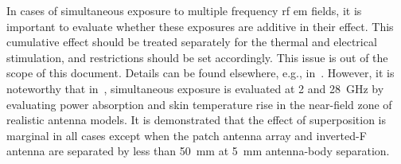 In cases of simultaneous exposure to multiple frequency \gls{rf} \gls{em} fields, it is important to evaluate whether these exposures are additive in their effect.
This cumulative effect should be treated separately for the thermal and electrical stimulation, and restrictions should be set accordingly.
This issue is out of the scope of this document.
Details can be found elsewhere, e.g., in~\cite{ICNIRP2020Guidelines, IEEE2019Standard}.
However, it is noteworthy that in~\cite{Miura2021Power}, simultaneous exposure is evaluated at \SI{2}{} and \SI{28}{\GHz} by evaluating power absorption and skin temperature rise in the near-field zone of realistic antenna models.
It is demonstrated that the effect of superposition is marginal in all cases except when the patch antenna array and inverted-F antenna are separated by less than \SI{50}{\mm} at \SI{5}{\mm} antenna-body separation.

